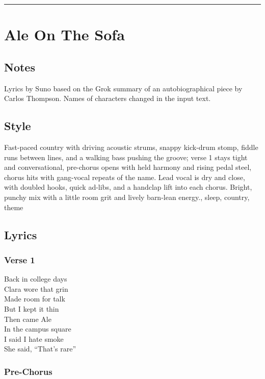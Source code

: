 \begin{center}\rule{0.5\linewidth}{0.5pt}\end{center}

\section{Ale On The Sofa}\label{ale-on-the-sofa}

\subsection{Notes}\label{notes-28}

Lyrics by Suno based on the Grok summary of an autobiographical piece by
Carlos Thompson. Names of characters changed in the input text.

\subsection{Style}\label{style-27}

Fast-paced country with driving acoustic strums, snappy kick-drum stomp,
fiddle runs between lines, and a walking bass pushing the groove; verse
1 stays tight and conversational, pre-chorus opens with held harmony and
rising pedal steel, chorus hits with gang-vocal repeats of the name.
Lead vocal is dry and close, with doubled hooks, quick ad-libs, and a
handclap lift into each chorus. Bright, punchy mix with a little room
grit and lively barn-lean energy., sleep, country, theme

\subsection{Lyrics}\label{lyrics-27}

\subsubsection{Verse 1}\label{verse-1-23}

Back in college days\\
Clara wore that grin\\
Made room for talk\\
But I kept it thin\\
Then came Ale\\
In the campus square\\
I said I hate smoke\\
She said, ``That's rare''

\subsubsection{Pre-Chorus}\label{pre-chorus-37}

